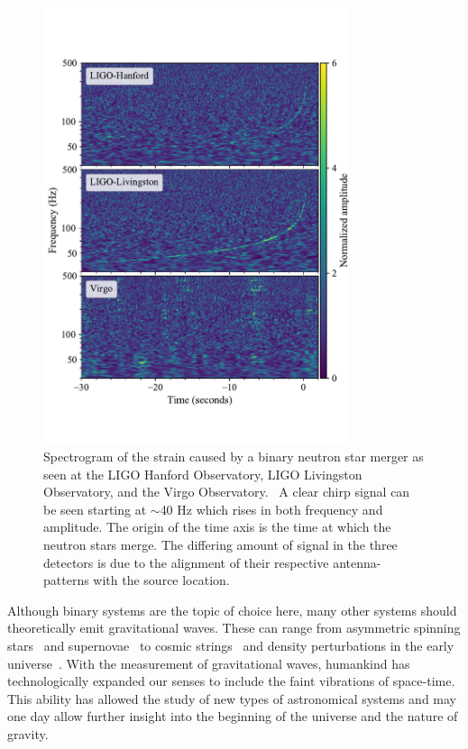 \documentclass [12pt, proquest]{uwthesis}[2019]
\begin{document}
\begin{figure}
\begin{center}
\includegraphics[width=0.8\textwidth]{GW170817.pdf}
\caption[Spectrogram of the strain caused by a binary neutron star merger]{Spectrogram of the strain caused by a binary neutron star merger as seen at the LIGO Hanford Observatory, LIGO Livingston Observatory, and the Virgo Observatory.~\cite{GW170817} A clear chirp signal can be seen starting at $\sim$40 Hz which rises in both frequency and amplitude. The origin of the time axis is the time at which the neutron stars merge. The differing amount of signal in the three detectors is due to the alignment of their respective antenna-patterns with the source location.}
\label{GW170817}
\end{center}
\end{figure}
 
 Although binary systems are the topic of choice here, many other systems should theoretically emit gravitational waves. These can range from asymmetric spinning stars~\cite{contGW} and supernovae~\cite{SN} to cosmic strings~\cite{strings} and density perturbations in the early universe~\cite{inflation}. With the measurement of gravitational waves, humankind has technologically expanded our senses to include the faint vibrations of space-time. This ability has allowed the study of new types of astronomical systems and may one day allow further insight into the beginning of the universe and the nature of gravity.
\pagebreak
\end{document}
